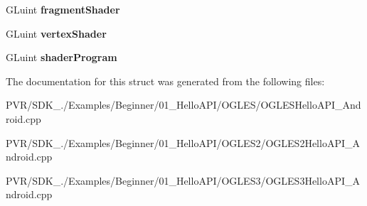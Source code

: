 \begin{DoxyCompactItemize}
\item 
\hypertarget{struct_s_hello_a_p_i_data_a6047bb2a2004a589ceffff90f094a196}{G\+Luint {\bfseries fragment\+Shader}}\label{struct_s_hello_a_p_i_data_a6047bb2a2004a589ceffff90f094a196}

\item 
\hypertarget{struct_s_hello_a_p_i_data_aee903a7c632e2192a137f7d0a3878a74}{G\+Luint {\bfseries vertex\+Shader}}\label{struct_s_hello_a_p_i_data_aee903a7c632e2192a137f7d0a3878a74}

\item 
\hypertarget{struct_s_hello_a_p_i_data_abff40a10f8552bb87339541b6e10f7d0}{G\+Luint {\bfseries shader\+Program}}\label{struct_s_hello_a_p_i_data_abff40a10f8552bb87339541b6e10f7d0}

\end{DoxyCompactItemize}


The documentation for this struct was generated from the following files\+:\begin{DoxyCompactItemize}
\item 
P\+V\+R/\+S\+D\+K\+\_./\+Examples/\+Beginner/01\+\_\+\+Hello\+A\+P\+I/\+O\+G\+L\+E\+S/O\+G\+L\+E\+S\+Hello\+A\+P\+I\+\_\+\+Android.\+cpp\item 
P\+V\+R/\+S\+D\+K\+\_./\+Examples/\+Beginner/01\+\_\+\+Hello\+A\+P\+I/\+O\+G\+L\+E\+S2/O\+G\+L\+E\+S2\+Hello\+A\+P\+I\+\_\+\+Android.\+cpp\item 
P\+V\+R/\+S\+D\+K\+\_./\+Examples/\+Beginner/01\+\_\+\+Hello\+A\+P\+I/\+O\+G\+L\+E\+S3/O\+G\+L\+E\+S3\+Hello\+A\+P\+I\+\_\+\+Android.\+cpp\end{DoxyCompactItemize}
